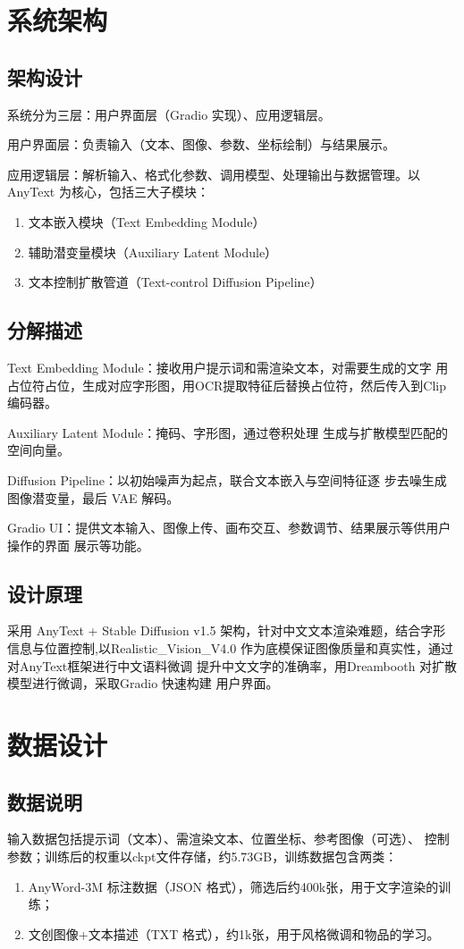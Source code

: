 \documentclass[a4paper,12pt]{article}
\begin{document}
\section{系统架构}
\subsection{架构设计}
系统分为三层：用户界面层（Gradio 实现）、应用逻辑层。

用户界面层：负责输入（文本、图像、参数、坐标绘制）与结果展示。

应用逻辑层：解析输入、格式化参数、调用模型、处理输出与数据管理。以 AnyText 为核心，包括三大子模块：

\begin{enumerate}
    \item 文本嵌入模块（Text Embedding Module）
    \item 辅助潜变量模块（Auxiliary Latent Module）
    \item 文本控制扩散管道（Text-control Diffusion Pipeline）
\end{enumerate}
\subsection{分解描述}
Text Embedding Module：接收用户提示词和需渲染文本，对需要生成的文字
用占位符占位，生成对应字形图，用OCR提取特征后替换占位符，然后传入到Clip编码器。

Auxiliary Latent Module：掩码、字形图，通过卷积处理
生成与扩散模型匹配的空间向量。

Diffusion Pipeline：以初始噪声为起点，联合文本嵌入与空间特征逐
步去噪生成图像潜变量，最后 VAE 解码。

Gradio UI：提供文本输入、图像上传、画布交互、参数调节、结果展示等供用户操作的界面
展示等功能。
\subsection{设计原理}
采用 AnyText + Stable Diffusion v1.5 架构，针对中文文本渲染难题，结合字形
信息与位置控制,以Realistic\_Vision\_V4.0 作为底模保证图像质量和真实性，通过对AnyText框架进行中文语料微调
提升中文文字的准确率，用Dreambooth 对扩散模型进行微调，采取Gradio 快速构建 用户界面。

\section{数据设计}
\subsection{数据说明}
输入数据包括提示词（文本）、需渲染文本、位置坐标、参考图像（可选）、
控制参数；训练后的权重以ckpt文件存储，约5.73GB，训练数据包含两类：
\begin{enumerate}
    \item AnyWord-3M 标注数据（JSON 格式），筛选后约400k张，用于文字渲染的训练；

    \item 文创图像+文本描述（TXT 格式），约1k张，用于风格微调和物品的学习。
\end{enumerate}
\end{document}
